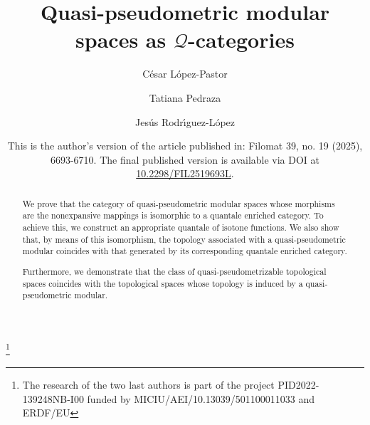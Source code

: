 \documentclass[11pt,a4paper]{amsart}
\theoremstyle{definition}
\begin{document}
	
	\title[Quasi-pseudometric modular spaces as $\mathscr{Q}$-categories]{Quasi-pseudometric modular spaces as $\mathscr{Q}$-categories}
	
	\author[C. L\'opez-Pastor]{C\'esar L\'opez-Pastor}
	\address[C. L\'opez-Pastor]{Departamento de Matemáticas, Universitat d'Alacant, Ctra. Sant Vicent del Raspeig, 03690 Alicante, Spain}
	
	\author[T. Pedraza]{Tatiana Pedraza}
	\address[T. Pedraza]{Instituto Universitario de Matem\'atica Pura y Aplicada, Universitat Polit\`ecnica de Val\`encia, Camino de Vera s/n, 46022 Valencia, Spain}
	
	\author[J. Rodr\'{\i}guez-L\'opez]{Jes\'us Rodr\'{\i}guez-L\'opez}
	\address[J. Rodr\'{\i}guez-L\'opez]{Instituto Universitario de Matem\'atica Pura y Aplicada, Universitat Polit\`ecnica de Val\`encia, Camino de Vera s/n, 46022 Valencia, Spain}
	\thanks{The research of the two last authors is part of the project PID2022-139248NB-I00 funded by MICIU/AEI/10.13039/501100011033 and ERDF/EU }
	
	
	
	
	
	
	
	
	
	
	
	\begin{abstract}
		We prove that the category of quasi-pseudometric modular spaces whose morphisms are the nonexpansive mappings is isomorphic to a quantale enriched category. To achieve this, we construct an appropriate quantale of isotone functions. We also show that, by means
		of this isomorphism, the topology associated with a quasi-pseudometric
		modular coincides with that generated by its corresponding quantale enriched
		category.
		
		Furthermore, we demonstrate that the class of quasi-pseudometrizable topological spaces coincides with the topological spaces whose topology is induced by a quasi-pseudometric modular. 
	\end{abstract}
	
	\date{This is the author's version of the article published in: Filomat 39, no. 19 (2025), 6693-6710. 
		The final published version is available via DOI at \href{https://doi.org/10.2298/FIL2519693L}{10.2298/FIL2519693L}.}
	
\end{document}
